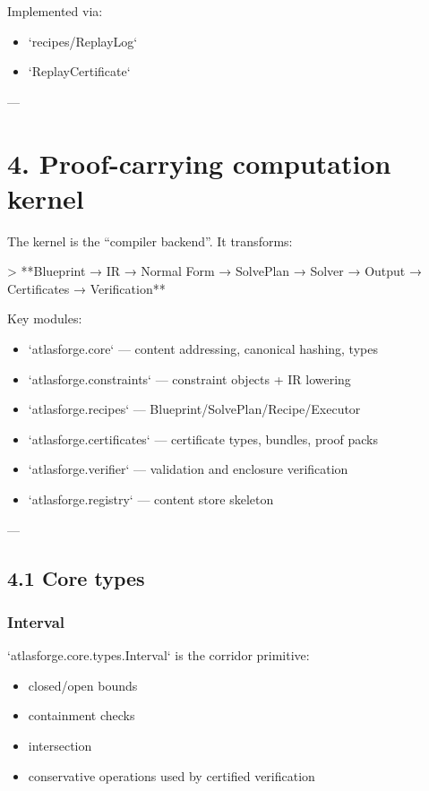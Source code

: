 \documentclass[11pt]{article}
\begin{document}
Implemented via:
\begin{itemize}
\item `recipes/ReplayLog`
\item `ReplayCertificate`
\end{itemize}

---

\section{4. Proof-carrying computation kernel}

The kernel is the “compiler backend”. It transforms:

> **Blueprint → IR → Normal Form → SolvePlan → Solver → Output → Certificates → Verification**

Key modules:

\begin{itemize}
\item `atlasforge.core` — content addressing, canonical hashing, types
\item `atlasforge.constraints` — constraint objects + IR lowering
\item `atlasforge.recipes` — Blueprint/SolvePlan/Recipe/Executor
\item `atlasforge.certificates` — certificate types, bundles, proof packs
\item `atlasforge.verifier` — validation and enclosure verification
\item `atlasforge.registry` — content store skeleton
\end{itemize}

---

\subsection{4.1 Core types}

\subsubsection{Interval}
`atlasforge.core.types.Interval` is the corridor primitive:

\begin{itemize}
\item closed/open bounds
\item containment checks
\item intersection
\item conservative operations used by certified verification
\end{itemize}
\end{document}

